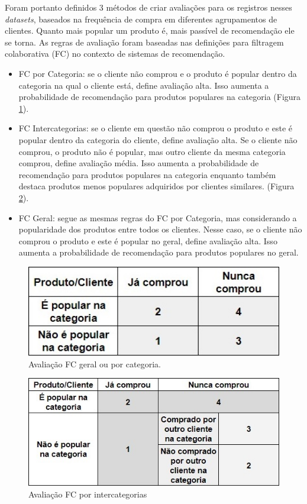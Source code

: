 Foram portanto definidos 3 métodos de criar avaliações para os registros nesses \textit{datasets}, baseados na frequência de compra em diferentes agrupamentos de clientes. Quanto mais popular um produto é, mais passível de recomendação ele se torna. As regras de avaliação foram baseadas nas definições para filtragem colaborativa (FC) no contexto de sistemas de recomendação. 

\begin{itemize}
   \item FC por Categoria: se o cliente não comprou e o produto é popular dentro da categoria na qual o cliente está, define avaliação alta. Isso aumenta a probabilidade de recomendação para produtos populares na categoria (Figura \ref{fig:fc-categ}).
    \item FC Intercategorias: se o cliente em questão não comprou o produto e este é popular dentro da categoria do cliente, define avaliação alta. Se o cliente não comprou, o produto não é popular, mas outro cliente da mesma categoria comprou, define avaliação média. Isso aumenta a probabilidade de recomendação para produtos populares na categoria enquanto também destaca produtos menos populares adquiridos por clientes similares. (Figura \ref{fig:fc-intercateg}).
    \item FC Geral: segue as mesmas regras do FC por Categoria, mas considerando a popularidade dos produtos entre todos os clientes. Nesse caso, se o cliente não comprou o produto e este é popular no geral, define avaliação alta. Isso aumenta a probabilidade de recomendação para produtos populares no geral.
\end{itemize}

\begin{figure}[htp]
    \centering
    \includegraphics[width=12cm]{doc/latex/text/images/fc-categ.jpg}
    \caption{Avaliação FC geral ou por categoria.}
    \label{fig:fc-categ}
\end{figure}

\begin{figure}[htp]
    \centering
    \includegraphics[width=12cm]{doc/latex/text/images/fc-intercateg.jpg}
    \caption{Avaliação FC por intercategorias}
    \label{fig:fc-intercateg}
\end{figure}

